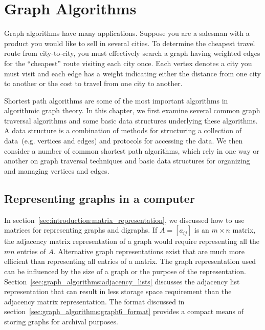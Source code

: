 
\chapter{Graph Algorithms}
\label{chap:graph_algorithms}

Graph algorithms have many applications. Suppose you are a
salesman with a product you would
like to sell in several cities. To determine the cheapest travel route
from city-to-city, you must effectively search a graph having weighted
edges for the ``cheapest'' route visiting each city once. Each vertex
denotes a city you must visit and each edge has a weight indicating
either the distance from one city to another or the
cost to travel from one city to another.

Shortest path algorithms are some of the most
important algorithms in algorithmic graph theory. In this chapter, we
first examine several common graph traversal algorithms and some basic
data structures underlying these algorithms. A
data structure is a combination of methods for structuring a
collection of data~(e.g. vertices and edges) and protocols for
accessing the data. We then consider a number of common shortest path
algorithms, which rely in one way or another on graph traversal
techniques and basic data structures for organizing and managing
vertices and edges.



\section{Representing graphs in a computer}

In section~\ref{sec:introduction:matrix_representation}, we discussed
how to use matrices for representing graphs and digraphs. If
$A = [a_{ij}]$ is an $m \times n$ matrix, the adjacency matrix
representation of a graph would require representing all the $mn$
entries of $A$. Alternative graph representations exist that are much
more efficient than representing all entries of a matrix. The graph
representation used can be influenced by the size of a graph or the
purpose of the representation.
Section~\ref{sec:graph_algorithms:adjacency_lists} discusses the
adjacency list representation that can result in
less storage space requirement than the adjacency
matrix representation. The
\graphsix\index{\graphsix} format discussed in
section~\ref{sec:graph_algorithms:graph6_format} provides a compact
means of storing graphs for archival purposes.


